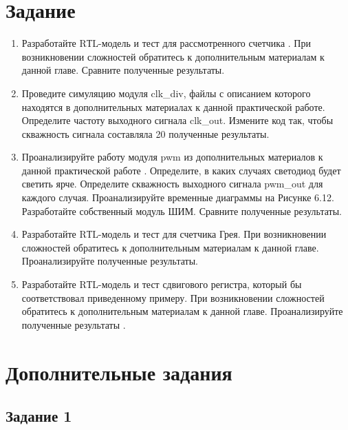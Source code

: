 \documentclass[a4paper,14pt]{article}
\begin{document}
	
	\tableofcontents
	\pagebreak
	\section{Задание}
	
	\begin{enumerate}
		\item Разработайте RТL-модель и тест для рассмотренного счетчика . При возникновении
		сложностей обратитесь к дополнительным материалам к данной главе. Сравните полученные
		результаты.
		
		\item Проведите симуляцию модуля clk\_div, файлы с описанием которого находятся в
		дополнительных материалах к данной практической работе. Определите частоту выходного
		сигнала clk\_out. Измените код так, чтобы скважность сигнала составляла 20 %
		полученные результаты.
		
		\item Проанализируйте работу модуля pwm из дополнительных материалов к данной практической
		работе . Определите, в каких случаях светодиод будет светить ярче. Определите скважность
		выходного сигнала pwm\_out для каждого случая. Проанализируйте временные диаграммы на
		Рисунке 6.12. Разработайте собственный модуль ШИМ. Сравните полученные результаты.
		
		\item Разработайте RТL-модель и тест для счетчика Грея. При возникновении сложностей
		обратитесь к дополнительным материалам к данной главе. Проанализируйте полученные
		результаты.
		
		\item Разработайте RТL-модель и тест сдвигового регистра, который бы соответствовал
		приведенному примеру. При возникновении сложностей обратитесь к дополнительным
		материалам к данной главе. Проанализируйте полученные результаты .
		
	\end{enumerate}
	
	\section{Дополнительные задания}
	
	\subsection{Задание 1}
	
\end{document}
